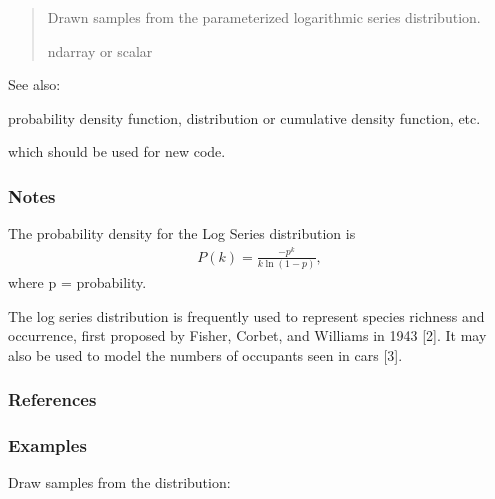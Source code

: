 \documentclass[letterpaper,10pt,english]{sphinxmanual}
\begin{document}
\begin{fulllineitems}
\begin{quote}
\begin{description}
\begin{itemize}
\end{itemize}

\sphinxAtStartPar
{} \textendash{} Drawn samples from the parameterized logarithmic series distribution.

\sphinxAtStartPar
ndarray or scalar

\end{description}\end{quote}


\begin{sphinxseealso}{See also:}
\begin{description}
\sphinxAtStartPar
probability density function, distribution or cumulative density function, etc.

\sphinxAtStartPar
which should be used for new code.

\end{description}


\end{sphinxseealso}

\subsubsection*{Notes}

\sphinxAtStartPar
The probability density for the Log Series distribution is
\begin{equation*}
\begin{split}P(k) = \frac{-p^k}{k \ln(1-p)},\end{split}
\end{equation*}
\sphinxAtStartPar
where p = probability.

\sphinxAtStartPar
The log series distribution is frequently used to represent species
richness and occurrence, first proposed by Fisher, Corbet, and
Williams in 1943 {[}2{]}.  It may also be used to model the numbers of
occupants seen in cars {[}3{]}.
\subsubsection*{References}
\subsubsection*{Examples}

\sphinxAtStartPar
Draw samples from the distribution:


\end{fulllineitems}
\end{document}
